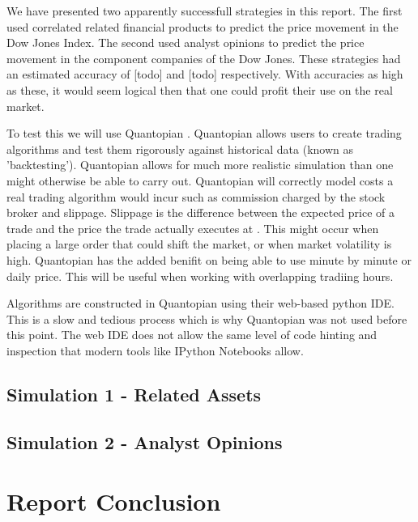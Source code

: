 \documentclass{report}
\begin{document}
We have presented two apparently successfull strategies in this report. The first used correlated related financial products to predict the price movement in the Dow Jones Index. The second used analyst opinions to predict the price movement in the component companies of the Dow Jones. These strategies had an estimated accuracy of [todo] and [todo] respectively. With accuracies as high as these, it would seem logical then that one could profit their use on the real market.

To test this we will use Quantopian \cite{quantopian}. Quantopian allows users to create trading algorithms and test them rigorously against historical data (known as 'backtesting'). Quantopian allows for much more realistic simulation than one might otherwise be able to carry out. Quantopian will correctly model costs a real trading algorithm would incur such as commission charged by the stock broker and slippage. Slippage is the difference between the expected price of a trade and the price the trade actually executes at \cite{slippage}. This might occur when placing a large order that could shift the market, or when market volatility is high. Quantopian has the added benifit on being able to use minute by minute or daily price. This will be useful when working with overlapping tradiing hours.

Algorithms are constructed in Quantopian using their web-based python IDE. This is a slow and tedious process which is why Quantopian was not used before this point. The web IDE does not allow the same level of code hinting and inspection that modern tools like IPython Notebooks allow.

\section{Simulation 1 - Related Assets}

\section{Simulation 2 - Analyst Opinions}

\chapter{Report Conclusion}



\end{document}
